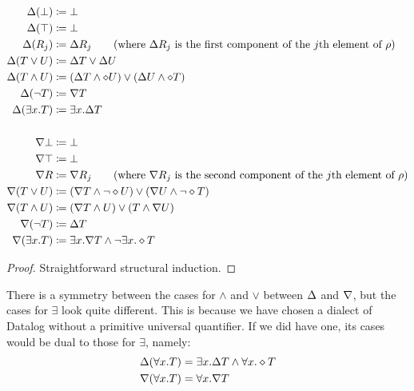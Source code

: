 \begin{thm}
  \begin{align*}
  \updiff(\bot) &\defeq \bot\\
  \updiff(\top) &\defeq \bot\\
  \updiff(R_j) &\defeq \updiff R_j \tag{where $\updiff R_j$ is the first component of the $j$th element of $\bothchanges$}\\
  \updiff(T\vee U) &\defeq \updiff T \vee \updiff U\\
  \updiff(T\wedge U) &\defeq (\updiff T\wedge \bothdiff U)
                           \vee
                           (\updiff U \wedge \bothdiff T)\\
  \updiff(\neg T) &\defeq \downdiff T\\
  \updiff(\exists x.T) &\defeq \exists x.\updiff T\\
    \\
  \downdiff\bot &\defeq \bot\\
  \downdiff\top &\defeq \bot\\
  \downdiff R &\defeq \downdiff R_j \tag{where $\downdiff R_j$ is the second component of the $j$th element of $\bothchanges$}\\
  \downdiff(T\vee U) &\defeq (\downdiff T \wedge \neg \bothdiff U)
                           \vee
                           (\downdiff U \wedge \neg \bothdiff T)\\
  \downdiff(T\wedge U) &\defeq (\downdiff T\wedge U) \vee (T \wedge \downdiff U)\\
  \downdiff(\neg T) &\defeq \updiff T\\
  \downdiff(\exists x.T) &\defeq \exists x.\downdiff T \wedge \neg \exists x.\bothdiff T
  \end{align*}
\end{thm}
\ifproofs
\begin{proof}
  Straightforward structural induction.
\end{proof}
\fi

There is a symmetry between the cases for $\wedge$ and $\vee$ between $\Delta$
and $\nabla$, but the cases for $\exists$ look quite different.
This is because we have chosen a dialect of Datalog without a primitive universal quantifier.
If we did have one, its cases would be dual to those for $\exists$, namely:
\begin{align*}
\Delta(\forall x.T) &= \exists x. \Delta T \wedge \forall x. \diamond T\\
\nabla(\forall x.T) &= \forall x. \nabla T
\end{align*}

